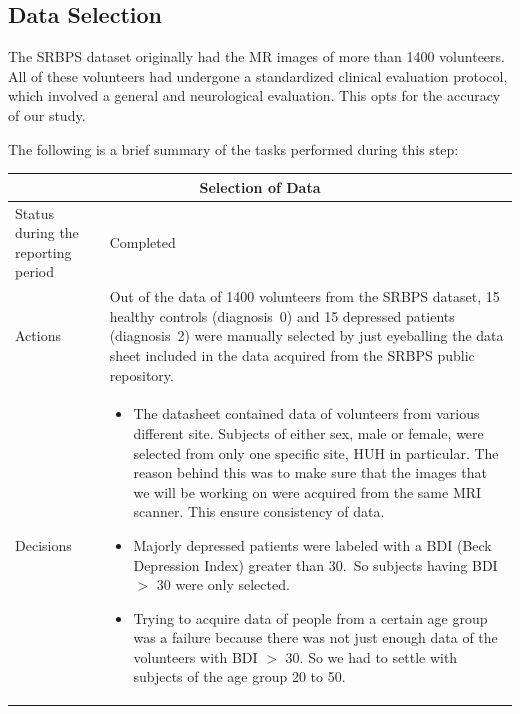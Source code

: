 \documentclass[12pt]{article}
\begin{document}
\subsection{Data Selection}%
\label{sub:data_selection}

The SRBPS dataset originally had the MR images of more than 1400
volunteers. All of these volunteers had undergone a standardized
clinical evaluation protocol, which involved a general and
neurological evaluation. This opts for the accuracy of our study.

The following is a brief summary of the tasks performed during this
step:

\begin{table}[H]
  \centering
  \begin{tabular} {| m{3.3cm} | m{11.5cm} | }
    \hline
    \multicolumn{2}{|c|}{Selection of Data} \\ \hline
    Status during the reporting period   & Completed   \\ \hline
    Actions &
    Out of the data of 1400 volunteers from the SRBPS dataset, 15
    healthy controls (diagnosis~0) and 15 depressed patients
    (diagnosis~2) were manually selected by just eyeballing the data
    sheet included in the data acquired from the SRBPS public
    repository.  \\ \hline

    Decisions &
    \begin{itemize}

      \item The datasheet contained data of volunteers from various
        different site. Subjects of either sex, male or female, were
        selected from only one specific site, HUH in particular. The
        reason behind this was to make sure that the images that we
        will be working on were acquired from the same MRI scanner.
        This ensure consistency of data.

      \item Majorly depressed patients were labeled with a BDI (Beck
        Depression Index) greater than 30.~So subjects having
        BDI $>$ 30 were only selected.

      \item Trying to acquire data of people from a certain age group
        was a failure because there was not just enough data of the
        volunteers with BDI $>$ 30. So we had to settle with subjects
        of the age group 20 to 50.

    \end{itemize} \\ \hline


\end{tabular}
\end{table}
\end{document}
